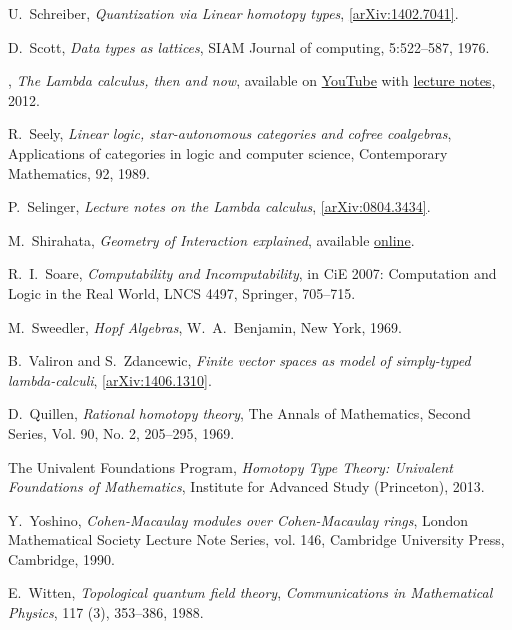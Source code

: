 \documentclass[english,letter paper,12pt,reqno]{article}
\theoremstyle{example}
\numberwithin{equation}{section}
\begin{document}
\begin{thebibliography}{BHLS03}
U.~Schreiber, \textsl{Quantization via {L}inear homotopy types}, \href{http://arxiv.org/abs/1402.7041}{[arXiv:1402.7041]}.

D.~Scott, \textsl{Data types as lattices}, SIAM Journal of computing, 5:522--587, 1976.

\bysame, \textsl{The {L}ambda calculus, then and now}, available on \href{http://www.youtube.com/watch?v=7cPtCpyBPNI}{YouTube} with \href{http://turing100.acm.org/lambda_calculus_timeline.pdf}{lecture notes}, 2012.

R.~Seely, \textsl{Linear logic, star-autonomous categories and cofree coalgebras}, Applications of categories in logic and computer science, Contemporary Mathematics, 92, 1989.

P.~Selinger, \textsl{Lecture notes on the {L}ambda calculus}, \href{http://arxiv.org/abs/0804.3434}{[arXiv:0804.3434]}.

M.~Shirahata, \textsl{Geometry of {I}nteraction explained}, available \href{http://www.kurims.kyoto-u.ac.jp/~hassei/algi-13/kokyuroku/19_shirahata.pdf}{online}.

R.~I.~Soare, \textsl{Computability and {I}ncomputability}, in CiE 2007: Computation and Logic in the Real World, LNCS 4497, Springer, 705--715.
  
M.~Sweedler, \textsl{Hopf Algebras}, W.~A.~Benjamin, New York, 1969.

B.~Valiron and S.~Zdancewic, \textsl{Finite vector spaces as model of simply-typed lambda-calculi}, \href{http://arxiv.org/abs/1406.1310v1}{[arXiv:1406.1310]}.

D.~Quillen, \textsl{Rational homotopy theory}, The Annals of Mathematics, Second Series, Vol. 90, No. 2, 205--295, 1969.

The Univalent Foundations Program, \textsl{Homotopy {T}ype {T}heory: {U}nivalent {F}oundations of {M}athematics}, Institute for Advanced Study (Princeton), 2013.

Y.~Yoshino, \emph{Cohen-{M}acaulay modules over {C}ohen-{M}acaulay rings},
  London Mathematical Society Lecture Note Series, vol. 146, Cambridge
  University Press, Cambridge, 1990. 
  
E.~Witten, \textsl{Topological quantum field theory}, \textsl{Communications in Mathematical Physics}, 117 (3), 353--386, 1988.

\end{thebibliography}
\end{document}
